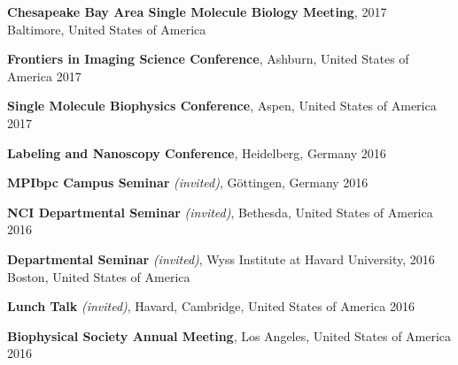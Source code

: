 \documentclass[margin,line]{res}
\begin{document}
\begin{resume}
\vspace*{-2.5mm}
{\bf Chesapeake Bay Area Single Molecule Biology Meeting},  \hfill 2017\\
Baltimore, United States of America%

\vspace*{-2.5mm}
{\bf Frontiers in Imaging Science Conference}, Ashburn, United States of America \hfill 2017%

\vspace*{-2.5mm}
{\bf Single Molecule Biophysics Conference}, Aspen, United States of America \hfill 2017%

\vspace*{-2.5mm}
{\bf Labeling and Nanoscopy Conference}, Heidelberg, Germany \hfill 2016%

\vspace*{-2.5mm}
{\bf MPIbpc Campus Seminar} {\it (invited)}, Göttingen, Germany \hfill 2016%

\vspace*{-2.5mm}
{\bf NCI Departmental Seminar} {\it (invited)}, Bethesda, United States of America \hfill 2016%

\vspace*{-2.5mm}
{\bf Departmental Seminar} {\it (invited)}, Wyss Institute at Havard University,  \hfill 2016\\
Boston, United States of America

\vspace*{-2.5mm}
{\bf Lunch Talk} {\it (invited)}, Havard, Cambridge, United States of America \hfill 2016%

\vspace*{-2.5mm}
{\bf Biophysical Society Annual Meeting}, Los Angeles, United States of America \hfill 2016%


\end{resume}
\end{document}
